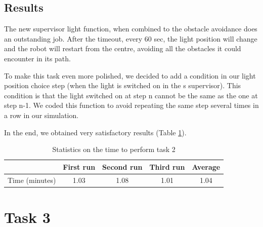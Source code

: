\documentclass[lettersize,journal]{IEEEtran}
\begin{document}
\subsection{Results}
The new supervisor light function, when combined to the obstacle avoidance does an outstanding job. After the timeout, every 60 sec, the light position will change and the robot will restart from the centre, avoiding all the obstacles it could encounter in its path.
\par
To make this task even more polished, we decided to add a condition in our light position choice step (when the light is switched on in the s
supervisor). This condition is that the light switched on at step n cannot be the same as the one at step n-1. We coded this function to avoid repeating the same step several times in a row in our simulation.
\par
In the end, we obtained very satisfactory results (Table \ref{task2}).

\begin{table}[H]
\begin{center}
\caption{Statistics on the time to perform task 2}
\label{task2}
\begin{tabular}{| c | c | c | c | c |}
\hline
   & First run & Second run & Third run & Average\\[.1em]
\hline
Time (minutes) & 1.03 & 1.08 & 1.01 & 1.04\\[.1em]
\hline
\end{tabular}
\end{center}
\end{table}

\section{Task 3}
\end{document}
